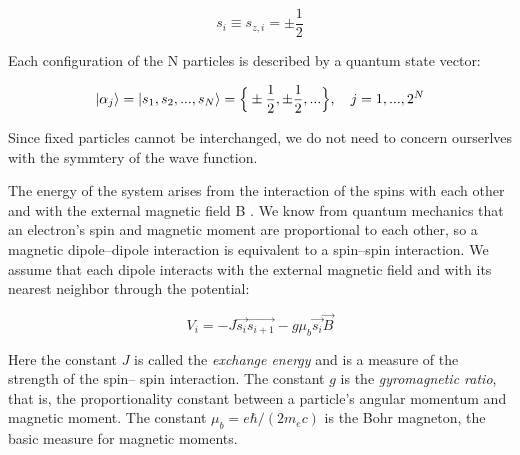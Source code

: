 \documentclass[12pt]{article}
\theoremstyle{plain}
\begin{document}
\vspace{2mm}

\begin{equation*}
    s_{i} \equiv s_{z, i} = \pm \frac{1}{2}
\end{equation*}

\vspace{2mm}

\par Each configuration of the N particles is described by a quantum state vector:

\vspace{2mm}

\begin{equation*}
    \ket{\alpha_{j}} = \ket{s_1, s_2, ..., s_N} = \Big\{ \pm \frac{1}{2}, \pm \frac{1}{2}, ...\Big\}, \quad j = 1, ..., 2^{N}
\end{equation*}

\vspace{2mm}

\par Since fixed particles cannot be interchanged, we do not need to concern
ourserlves with the symmtery of the wave function.

\vspace{2mm}

\par The energy of the system arises from the interaction of the spins with each other and
with the external magnetic field B . We know from quantum mechanics that an electron’s spin
and magnetic moment are proportional to each other, so a magnetic dipole–dipole interaction
is equivalent to a spin–spin interaction. We assume that each dipole interacts with the external
magnetic field and with its nearest neighbor through the potential:

\vspace{2mm}

\begin{equation*}
    V_{i} = -J\vec{s_{i}}\vec{s_{i+1}} - g\mu_{b}\vec{s_i}\vec{B}
\end{equation*}

\vspace{2mm}

\par Here the constant $J$ is called the \textit{exchange energy} and is a measure of the strength of the spin–
spin interaction. The constant $g$ is the \textit{gyromagnetic ratio}, that is, the proportionality constant
between a particle’s angular momentum and magnetic moment. The constant $\mu_b = e\hbar / (2m_e c)$
is the Bohr magneton, the basic measure for magnetic moments.
\end{document}
